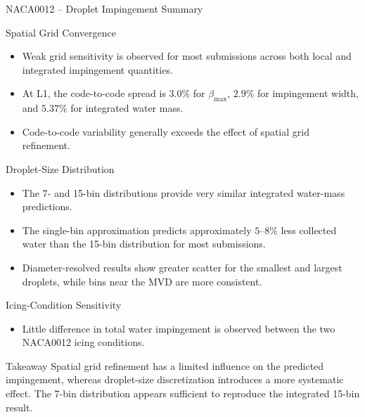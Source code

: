 
\begin{frame}[shrink]{\small NACA0012 -- Droplet Impingement Summary}
\scriptsize

\begin{block}{\scriptsize Spatial Grid Convergence}
\begin{itemize}
    \item Weak grid sensitivity is observed for most submissions across both local and integrated impingement quantities.
    \item At L1, the code-to-code spread is $3.0\%$ for $\beta_{\max}$, $2.9\%$ for impingement width, and $5.37\%$ for integrated water mass.
    \item Code-to-code variability generally exceeds the effect of spatial grid refinement.
\end{itemize}
\end{block}

\vspace{0.2cm}

\begin{block}{\scriptsize Droplet-Size Distribution}
\begin{itemize}
    \item The 7- and 15-bin distributions provide very similar integrated water-mass predictions.
    \item The single-bin approximation predicts approximately $5$--$8\%$ less collected water than the 15-bin distribution for most submissions.
    \item Diameter-resolved results show greater scatter for the smallest and largest droplets, while bins near the MVD are more consistent.
\end{itemize}
\end{block}

\vspace{0.2cm}

\begin{block}{\scriptsize Icing-Condition Sensitivity}
\begin{itemize}
    \item Little difference in total water impingement is observed between the two NACA0012 icing conditions.
\end{itemize}
\end{block}

\vspace{0.2cm}

\begin{alertblock}{\scriptsize Takeaway}
Spatial grid refinement has a limited influence on the predicted impingement, whereas droplet-size discretization introduces a more systematic effect. The 7-bin distribution appears sufficient to reproduce the integrated 15-bin result.
\end{alertblock}

\end{frame}


